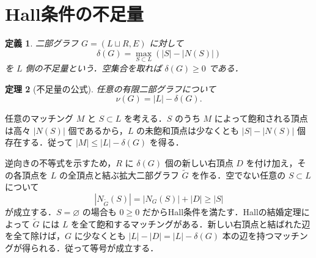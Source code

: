 \documentclass[a5paper,10pt,onecolumn]{jsarticle}
\makeatletter
\theoremstyle{mathnotetheorem}
\newtheorem{theorem}{定理}[section]
\newtheorem{definition}[theorem]{定義}
\renewcommand{\proofname}{証明}
\renewenvironment{proof}[1][\proofname]{%
  \par\pushQED{\qed}\normalfont\topsep4\p@\@plus2\p@\relax
  \trivlist\item[\hskip\labelsep\bfseries #1]\ignorespaces
}{\popQED\endtrivlist\@endpefalse}
\makeatother
\begin{document}
\section{Hall条件の不足量}
\begin{definition}
二部グラフ $G=(L\sqcup R,E)$ に対して
\[
 \delta(G)=\max_{S\subset L}(|S|-|N(S)|)
\]
を $L$ 側の\emph{不足量}という．空集合を取れば $\delta(G)\ge0$ である．
\end{definition}
\begin{theorem}[不足量の公式]\label{thm:deficiency}
任意の有限二部グラフについて
\[
 \nu(G)=|L|-\delta(G).
\]
\end{theorem}
\begin{proof}
任意のマッチング $M$ と $S\subset L$ を考える．$S$ のうち $M$ によって飽和される頂点は高々 $|N(S)|$ 個であるから，$L$ の未飽和頂点は少なくとも $|S|-|N(S)|$ 個存在する．従って $|M|\le|L|-\delta(G)$ を得る．

逆向きの不等式を示すため，$R$ に $\delta(G)$ 個の新しい右頂点 $D$ を付け加え，その各頂点を $L$ の全頂点と結ぶ拡大二部グラフ $\widetilde G$ を作る．空でない任意の $S\subset L$ について
\[
 |N_{\widetilde G}(S)|=|N_G(S)|+|D|
 \ge|S|
\]
が成立する．$S=\varnothing$ の場合も $0\ge0$ だからHall条件を満たす．Hallの結婚定理によって $\widetilde G$ には $L$ を全て飽和するマッチングがある．新しい右頂点と結ばれた辺を全て除けば，$G$ に少なくとも $|L|-|D|=|L|-\delta(G)$ 本の辺を持つマッチングが得られる．従って等号が成立する．
\end{proof}
\end{document}
